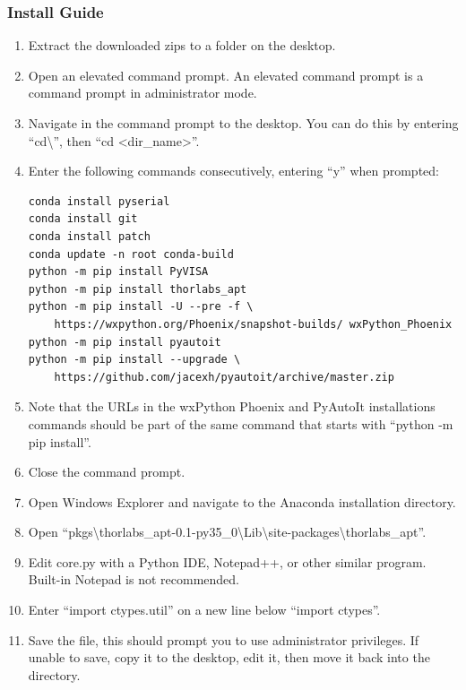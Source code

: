 \documentclass[11pt, letterpaper, titlepage]{article}
\begin{document}
\subsubsection{Install Guide} %
\begin{enumerate}
    \item Extract the downloaded zips to a folder on the desktop.
    \item Open an elevated command prompt.
        \subitem An elevated command prompt is a command prompt in administrator mode.
    \item Navigate in the command prompt to the desktop.
        \subitem You can do this by entering ``cd\textbackslash'', then ``cd \textless{}dir\_name\textgreater''.
    \item Enter the following commands consecutively, entering ``y'' when prompted:
    \begin{lstlisting}[frame=single]
conda install pyserial
conda install git
conda install patch
conda update -n root conda-build
python -m pip install PyVISA
python -m pip install thorlabs_apt
python -m pip install -U --pre -f \
    https://wxpython.org/Phoenix/snapshot-builds/ wxPython_Phoenix
python -m pip install pyautoit
python -m pip install --upgrade \
    https://github.com/jacexh/pyautoit/archive/master.zip
    \end{lstlisting}
    \item Note that the URLs in the wxPython Phoenix and PyAutoIt installations commands should be part of the same command that starts with ``python -m pip install''.
    \item Close the command prompt.
    \item Open Windows Explorer and navigate to the Anaconda installation directory.
    \item Open ``pkgs\textbackslash thorlabs\_apt-0.1-py35\_0\textbackslash Lib\textbackslash site-packages\textbackslash thorlabs\_apt''.
    \item Edit core.py with a Python IDE, Notepad++, or other similar program.
        \subitem Built-in Notepad is not recommended.
    \item Enter ``import ctypes.util'' on a new line below ``import ctypes''.
    \item Save the file, this should prompt you to use administrator privileges.
        \subitem If unable to save, copy it to the desktop, edit it, then move it back into the directory.
\end{enumerate}
\end{document}
